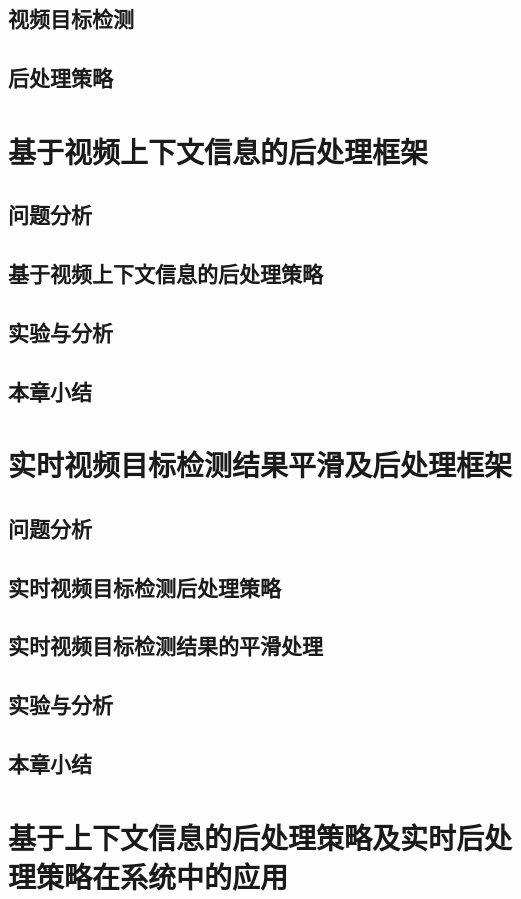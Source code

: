 \documentclass[winfonts,master,twoside,AutoFakeBold= {2}]{njuthesis}
\begin{document}
\section{视频目标检测}
\section{后处理策略}

\chapter{基于视频上下文信息的后处理框架}
\section{问题分析}
\section{基于视频上下文信息的后处理策略}
\section{实验与分析}
\section{本章小结}

\chapter{实时视频目标检测结果平滑及后处理框架}
\section{问题分析}
\section{实时视频目标检测后处理策略}
\section{实时视频目标检测结果的平滑处理}
\section{实验与分析}
\section{本章小结}


\chapter{基于上下文信息的后处理策略及实时后处理策略在系统中的应用}
\end{document}
